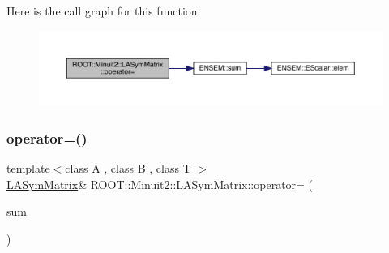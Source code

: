 Here is the call graph for this function\+:
\nopagebreak
\begin{figure}[H]
\begin{center}
\leavevmode
\includegraphics[width=350pt]{d3/d72/classROOT_1_1Minuit2_1_1LASymMatrix_a88d40828624a6418f8b94e239e30d322_cgraph}
\end{center}
\end{figure}
\mbox{\label{classROOT_1_1Minuit2_1_1LASymMatrix_a88d40828624a6418f8b94e239e30d322}} 
\subsubsection{\texorpdfstring{operator=()}{operator=()}\hspace{0.1cm}{\footnotesize\ttfamily [12/21]}}
{\footnotesize\ttfamily template$<$class A , class B , class T $>$ \\
\mbox{\hyperlink{classROOT_1_1Minuit2_1_1LASymMatrix}{L\+A\+Sym\+Matrix}}\& R\+O\+O\+T\+::\+Minuit2\+::\+L\+A\+Sym\+Matrix\+::operator= (\begin{DoxyParamCaption}\item[{const \mbox{\hyperlink{classROOT_1_1Minuit2_1_1ABObj}{A\+B\+Obj}}$<$ \mbox{\hyperlink{classROOT_1_1Minuit2_1_1sym}{sym}}, \mbox{\hyperlink{classROOT_1_1Minuit2_1_1ABSum}{A\+B\+Sum}}$<$ \mbox{\hyperlink{classROOT_1_1Minuit2_1_1ABObj}{A\+B\+Obj}}$<$ \mbox{\hyperlink{classROOT_1_1Minuit2_1_1sym}{sym}}, A, T $>$, \mbox{\hyperlink{classROOT_1_1Minuit2_1_1ABObj}{A\+B\+Obj}}$<$ \mbox{\hyperlink{classROOT_1_1Minuit2_1_1sym}{sym}}, B, T $>$ $>$, T $>$ \&}]{sum }\end{DoxyParamCaption})\hspace{0.3cm}{\ttfamily [inline]}}

